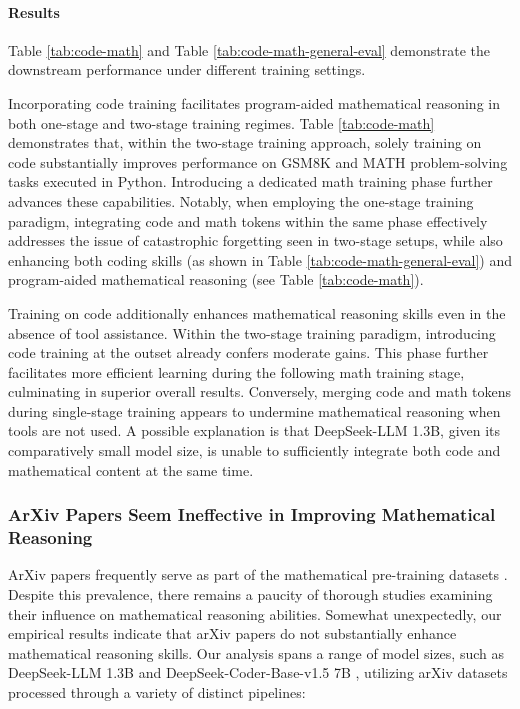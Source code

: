 \begin{itemize}[topsep=0pt]
\paragraph{Results}
Table \ref{tab:code-math} and Table \ref{tab:code-math-general-eval} demonstrate the downstream performance under different training settings.

Incorporating code training facilitates program-aided mathematical reasoning in both one-stage and two-stage training regimes. Table \ref{tab:code-math} demonstrates that, within the two-stage training approach, solely training on code substantially improves performance on GSM8K and MATH problem-solving tasks executed in Python. Introducing a dedicated math training phase further advances these capabilities. Notably, when employing the one-stage training paradigm, integrating code and math tokens within the same phase effectively addresses the issue of catastrophic forgetting seen in two-stage setups, while also enhancing both coding skills (as shown in Table \ref{tab:code-math-general-eval}) and program-aided mathematical reasoning (see Table \ref{tab:code-math}).

Training on code additionally enhances mathematical reasoning skills even in the absence of tool assistance. Within the two-stage training paradigm, introducing code training at the outset already confers moderate gains. This phase further facilitates more efficient learning during the following math training stage, culminating in superior overall results. Conversely, merging code and math tokens during single-stage training appears to undermine mathematical reasoning when tools are not used. A possible explanation is that DeepSeek-LLM 1.3B, given its comparatively small model size, is unable to sufficiently integrate both code and mathematical content at the same time.

\subsubsection{ArXiv Papers Seem Ineffective in Improving Mathematical Reasoning}

ArXiv papers frequently serve as part of the mathematical pre-training datasets \citep{minerva,gpt-f,llemma,mathpile}. Despite this prevalence, there remains a paucity of thorough studies examining their influence on mathematical reasoning abilities. Somewhat unexpectedly, our empirical results indicate that arXiv papers do not substantially enhance mathematical reasoning skills. Our analysis spans a range of model sizes, such as DeepSeek-LLM 1.3B and DeepSeek-Coder-Base-v1.5 7B \citep{deepseek-coder}, utilizing arXiv datasets processed through a variety of distinct pipelines:


\end{itemize}
